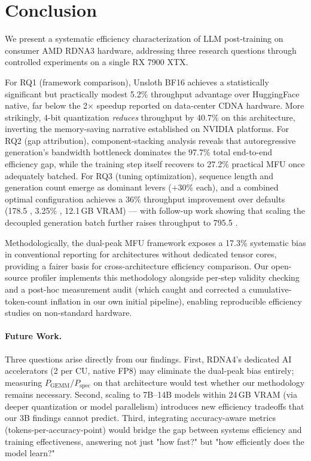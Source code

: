 \section{Conclusion}
\label{sec:conclusion}

We present a systematic efficiency characterization of LLM post-training on consumer AMD RDNA3 hardware, addressing three research questions through controlled experiments on a single RX 7900 XTX.

For RQ1 (framework comparison), Unsloth BF16 achieves a statistically significant but practically modest 5.2\% throughput advantage over HuggingFace native, far below the 2$\times$ speedup reported on data-center CDNA hardware. More strikingly, 4-bit quantization \emph{reduces} throughput by 40.7\% on this architecture, inverting the memory-saving narrative established on NVIDIA platforms. For RQ2 (gap attribution), component-stacking analysis reveals that autoregressive generation's bandwidth bottleneck dominates the 97.7\% total end-to-end efficiency gap, while the training step itself recovers to 27.2\% practical MFU once adequately batched. For RQ3 (tuning optimization), sequence length and generation count emerge as dominant levers ($+$30\% each), and a combined optimal configuration achieves a 36\% throughput improvement over defaults (178.5 \toksec{}, 3.25\% \mfuprac{}, 12.1\,GB VRAM) --- with follow-up work showing that scaling the decoupled generation batch further raises throughput to 795.5 \toksec{}.

Methodologically, the dual-peak MFU framework exposes a 17.3\% systematic bias in conventional reporting for architectures without dedicated tensor cores, providing a fairer basis for cross-architecture efficiency comparison. Our open-source profiler implements this methodology alongside per-step validity checking and a post-hoc measurement audit (which caught and corrected a cumulative-token-count inflation in our own initial pipeline), enabling reproducible efficiency studies on non-standard hardware.

\paragraph{Future Work.} Three questions arise directly from our findings. First, RDNA4's dedicated AI accelerators (2 per CU, native FP8) may eliminate the dual-peak bias entirely; measuring $P_{\text{GEMM}}/P_{\text{spec}}$ on that architecture would test whether our methodology remains necessary. Second, scaling to 7B--14B models within 24\,GB VRAM (via deeper quantization or model parallelism) introduces new efficiency tradeoffs that our 3B findings cannot predict. Third, integrating accuracy-aware metrics (tokens-per-accuracy-point) would bridge the gap between systems efficiency and training effectiveness, answering not just "how fast?" but "how efficiently does the model learn?"
